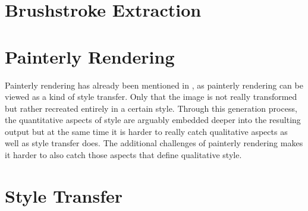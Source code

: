 








\section{Brushstroke Extraction}


\section{Painterly Rendering}

Painterly rendering has already been mentioned in , as painterly rendering
can be viewed as a kind of style transfer.
Only that the image is not really transformed but rather recreated entirely in a certain style.
Through this generation process, the quantitative aspects of style are arguably embedded deeper into the resulting output but at the same time it is harder to really catch qualitative aspects as well as style transfer does.
The additional challenges of painterly rendering makes it harder to also catch those aspects that define qualitative style.


\section{Style Transfer}

